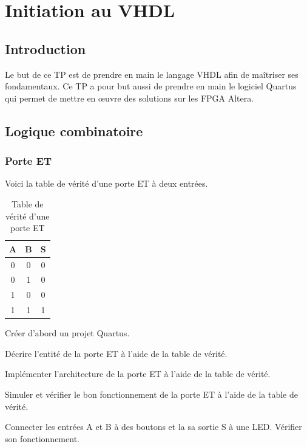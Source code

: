 \chapter{Initiation au VHDL}
\section{Introduction}
Le but de ce TP est de prendre en main le langage VHDL afin de maîtriser ses fondamentaux. Ce TP a pour but aussi de prendre en main le logiciel Quartus qui permet de mettre en œuvre des solutions sur les FPGA Altera.
\section{Logique combinatoire}
\subsection{Porte ET}
Voici la table de vérité d'une porte ET à deux entrées.
\begin{table}[ht]
    \centering
    \begin{tabular}{c c|c} 
        A & B & S \\
        \hline
        0 & 0 & 0 \\
        0 & 1 & 0 \\
        1 & 0 & 0 \\
        1 & 1 & 1
    \end{tabular}
    \caption{Table de vérité d'une porte ET}
\end{table}

Créer d'abord un projet Quartus.

\medskip

Décrire l'entité de la porte ET à l'aide de la table de vérité.

\medskip

Implémenter l'architecture de la porte ET à l'aide de la table de vérité.

\medskip

Simuler et vérifier le bon fonctionnement de la porte ET à l'aide de la table de vérité.

\medskip

Connecter les entrées A et B à des boutons et la sa sortie S à une LED. Vérifier son fonctionnement.
